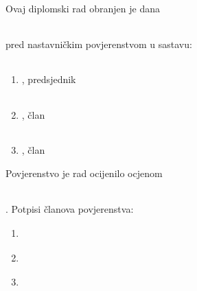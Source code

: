 %
\thispagestyle{empty}
%
Ovaj diplomski rad obranjen je dana
\begin{tabular}{p{5.0 cm}}
\\
\hline
\end{tabular}
pred nastavni\v{c}kim povjerenstvom
u sastavu:
%
\vskip 30pt
\begin{enumerate}
\item{
\begin{tabular}{p{8.0 cm}}

\\
\hline
\end{tabular}
, predsjednik
}
\vskip 20pt
\item{
\begin{tabular}{p{8.0 cm}}
\\
\hline
\end{tabular}
, \v{c}lan
}
\vskip 20pt
\item{
\begin{tabular}{p{8.0 cm}}
\\
\hline
\end{tabular}
, \v{c}lan
}
\end{enumerate}
\vskip 25pt
%
Povjerenstvo je rad ocijenilo ocjenom
\begin{tabular}{p{5.0 cm}}
\\
\hline
\end{tabular}.
\vskip 25pt
%
\noindent
Potpisi \v{c}lanova povjerenstva:
\vskip 30pt
%
\begin{enumerate}
\item{
\begin{tabular}{p{7.0 cm}}
\\
\hline
\end{tabular}
} %
\vskip 40pt
\item{
\begin{tabular}{p{7.0 cm}}
\\
\hline
\end{tabular}
} %
\vskip 40pt
\item{
\begin{tabular}{p{7.0 cm}}
\\
\hline
\end{tabular}
} %
\end{enumerate}

